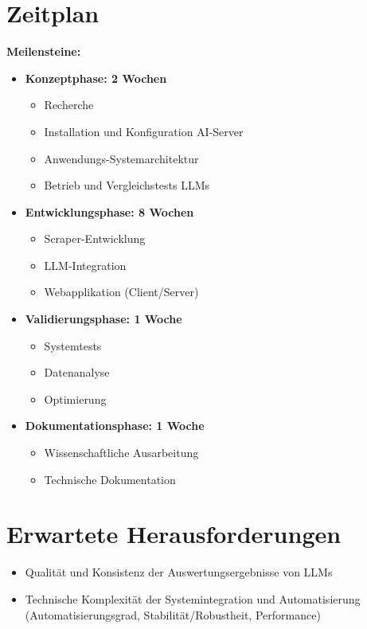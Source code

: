 \documentclass{article}
\begin{document}
\section{Zeitplan}
\textbf{Meilensteine:}
\begin{itemize}
	\item \textbf{Konzeptphase: 2 Wochen}
	      \begin{itemize}
		      \item Recherche
		      \item Installation und Konfiguration AI-Server
		      \item Anwendungs-Systemarchitektur
		      \item Betrieb und Vergleichstests LLMs
	      \end{itemize}
	\item \textbf{Entwicklungsphase: 8 Wochen}
	      \begin{itemize}
		      \item Scraper-Entwicklung
		      \item LLM-Integration
		      \item Webapplikation (Client/Server)
	      \end{itemize}
	\item \textbf{Validierungsphase: 1 Woche}
	      \begin{itemize}
		      \item Systemtests
		      \item Datenanalyse
		      \item Optimierung
	      \end{itemize}
	\item \textbf{Dokumentationsphase: 1 Woche}
	      \begin{itemize}
		      \item Wissenschaftliche Ausarbeitung
		      \item Technische Dokumentation
	      \end{itemize}
\end{itemize}

\section{Erwartete Herausforderungen}
\begin{itemize}
	\item Qualität und Konsistenz der Auswertungsergebnisse von LLMs
	\item Technische Komplexität der Systemintegration und Automatisierung (Automatisierungsgrad, Stabilität/Robustheit, Performance)
\end{itemize}
\end{document}
